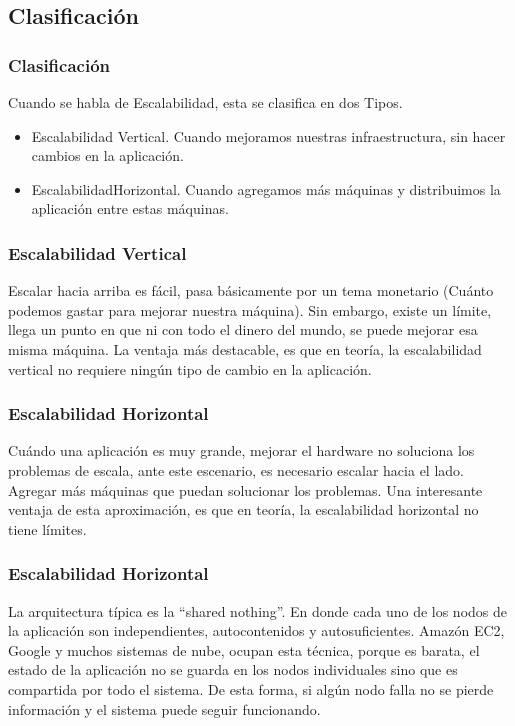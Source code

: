 \documentclass[12pt]{beamer}
\begin{document}
\subsection{Clasificación}

\begin{frame}
 \frametitle{Clasificación}
 Cuando se habla de Escalabilidad, esta se clasifica en dos Tipos.
 \begin{itemize}
  \item<2-> Escalabilidad \alert{Vertical}. Cuando mejoramos nuestras infraestructura, sin hacer cambios en la aplicación.
  \item<3-> Escalabilidad\alert{Horizontal}. Cuando agregamos más máquinas y distribuimos la aplicación entre estas máquinas.
 \end{itemize}
\end{frame}


\begin{frame}
 \frametitle{Escalabilidad Vertical}
 Escalar hacia arriba es fácil, pasa básicamente por un tema monetario (Cuánto podemos gastar para mejorar nuestra máquina). Sin embargo, existe un límite, llega un punto en que ni con todo el dinero del mundo, se puede mejorar esa misma máquina.
 \newline
 La ventaja más destacable, es que en teoría, la escalabilidad vertical no requiere ningún tipo de cambio en la aplicación.
\end{frame}


\begin{frame}
 \frametitle{Escalabilidad Horizontal}
 Cuándo una aplicación es muy grande, mejorar el hardware no soluciona los problemas de escala, ante este escenario, es necesario escalar hacia el lado. Agregar más máquinas que puedan solucionar los problemas.
 \newline
 Una interesante ventaja de esta aproximación, es que en teoría, la escalabilidad horizontal no tiene límites.
\end{frame}

\begin{frame}
 \frametitle{Escalabilidad Horizontal}
 La arquitectura típica es la ``shared nothing''. En donde cada uno de los nodos de la aplicación son independientes, autocontenidos y autosuficientes. Amazón EC2, Google y muchos sistemas de nube, ocupan esta técnica, porque es barata, el estado de la aplicación no se guarda en los nodos individuales sino que es compartida por todo el sistema. De esta forma, si algún nodo falla no se pierde información y el sistema puede seguir funcionando.
\end{frame}
\end{document}
